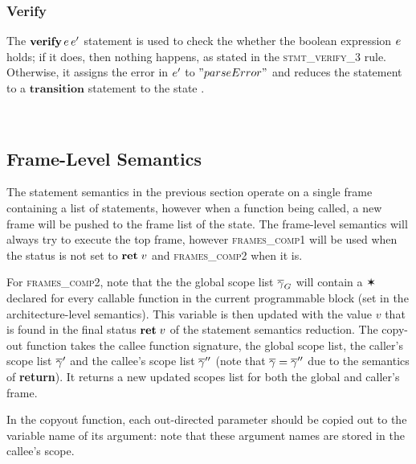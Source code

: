 \documentclass[UTF8]{article}
\begin{document}
\begin{figure}[ht!]
    \ottusedrule{\ottdrulestmtXXtrans{}} 
\end{figure}



\subsubsection*{Verify}
The $\mathbf{verify} \, e \, e'$ statement is used to check the whether the boolean expression $e$ holds; if it does, then nothing happens, as stated in the \textsc{stmt\_verify\_3} rule. Otherwise, it assigns the error in $e'$ to $"parseError"$ and reduces the statement to a $\mathbf{transition}$ statement to the state \reject{}.
 
\begin{figure}[ht!]
    \ottusedrule{\ottdrulestmtXXverifyXXThree{}} \\
    \ottusedrule{\ottdrulestmtXXverifyXXFour{}} 
\end{figure}



\subsection{Frame-Level Semantics}
The statement semantics in the previous section operate on a single frame containing a list of statements, however when a function being called, a new frame will be pushed to the frame list of the state. The frame-level semantics will always try to execute the top frame, however \textsc{frames\_comp1} will be used when the status is not set to $\textbf{ret}\;v$ and \textsc{frames\_comp2} when it is.

For \textsc{frames\_comp2}, note that the the global scope list $\overline{\gamma}_G$ will contain a $\varstar$ declared for every callable function in the current programmable block (set in the architecture-level semantics). This variable is then updated with the value $v$ that is found in the final status $\textbf{ret}\;v$ of the statement semantics reduction. The copy-out function takes the callee function signature, the global scope list, the caller's scope list $\overline{\gamma}'$ and the callee's scope list $\overline{\gamma}''$ (note that $\overline{\gamma} = \overline{\gamma}''$ due to the semantics of \textbf{return}). It returns a new updated scopes list for both the global and caller's frame.

In the copyout function, each out-directed parameter should be copied out to the variable name of its argument: note that these argument names are stored in the callee's scope.
\end{document}
